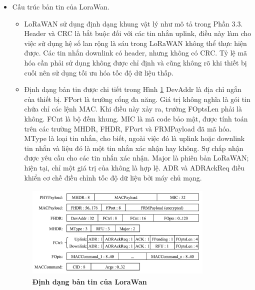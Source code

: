 \documentclass{article} %
\begin{document}
\begin{itemize}
		LoRaWAN quy định rằng mạng LoRaWAN nên sử dụng các băng tần ISM. Các băng tần này chịu sự điều chỉnh về công suất truyền tải tối đa và chu kỳ hoạt động. Các giới hạn chu kỳ hoạt động này dẫn đến các khoảng trễ giữa các khung truyền tải liên tiếp của thiết bị. Nếu giới hạn là 1\%, thiết bị sẽ phải chờ 100 lần thời gian của khung cuối cùng trước khi truyền lại trên cùng một kênh.
		
		\item Cấu trúc bản tin của LoraWan.
		
		\begin{itemize}[label=$\ast$]
			\item LoRaWAN sử dụng định dạng khung vật lý như mô tả trong Phần 3.3. Header và CRC là bắt buộc đối với các tin nhắn uplink, điều này làm cho việc sử dụng hệ số lan rộng là sáu trong LoRaWAN không thể thực hiện được. Các tin nhắn downlink có header, nhưng không có CRC. Tỷ lệ mã hóa cần phải sử dụng không được chỉ định và cũng không rõ khi thiết bị cuối nên sử dụng tối ưu hóa tốc độ dữ liệu thấp.
			
			\item Định dạng bản tin được chi tiết trong Hình \ref{khungdulieu} DevAddr là địa chỉ ngắn của thiết bị. FPort là trường cổng đa năng. Giá trị không nghĩa là gói tin chứa chỉ các lệnh MAC. Khi điều này xảy ra, trường FOptsLen phải là không. FCnt là bộ đếm khung. MIC là mã code bảo mật, được tính toán trên các trường MHDR, FHDR, FPort và FRMPayload đã mã hóa. MType là loại tin nhắn, cho biết, ngoài việc đó là uplink hoặc downlink tin nhắn và liệu đó là một tin nhắn xác nhận hay không. Sự chấp nhận được yêu cầu cho các tin nhắn xác nhận. Major là phiên bản LoRaWAN; hiện tại, chỉ một giá trị của không là hợp lệ. ADR và ADRAckReq điều khiển cơ chế điều chỉnh tốc độ dữ liệu bởi máy chủ mạng. 
			
		\end{itemize}
		\begin{figure}[!ht]
			\centering
			\includegraphics[width=9cm,height=4.5cm]{Images/khungdulieu.png}
			\caption[Định dạng bản tin của LoraWan \cite{augustin2016study}]{\bfseries \fontsize{12pt}{0pt}\selectfont Định dạng bản tin của LoraWan \cite{augustin2016study}}
			\label{khungdulieu}
		\end{figure}
		

\end{itemize}
\end{document}
